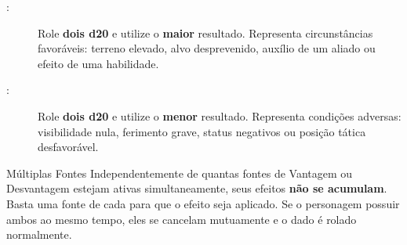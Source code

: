 \begin{description}
    \item[:] Role \textbf{dois d20} e utilize o \textbf{maior} resultado. Representa circunstâncias favoráveis: terreno elevado, alvo desprevenido, auxílio de um aliado ou efeito de uma habilidade.
    \item[:] Role \textbf{dois d20} e utilize o \textbf{menor} resultado. Representa condições adversas: visibilidade nula, ferimento grave, status negativos ou posição tática desfavorável.
\end{description}

\begin{rpgboxtips}{Múltiplas Fontes}
Independentemente de quantas fontes de Vantagem ou Desvantagem estejam ativas simultaneamente, seus efeitos \textbf{não se acumulam}. Basta uma fonte de cada para que o efeito seja aplicado. Se o personagem possuir ambos ao mesmo tempo, eles se cancelam mutuamente e o dado é rolado normalmente.
\end{rpgboxtips}
